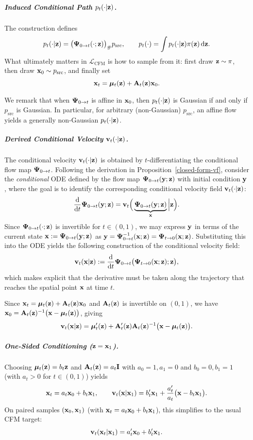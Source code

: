 \subparagraph{Induced Conditional Path $p_t(\cdot|{\mathbf{z}})$.}
The construction defines
\[
p_t(\cdot|{\mathbf{z}}) = \bigl({\bm{\Psi}}_{0\to t}( \cdot ;{\mathbf{z}})\bigr)_{\#} p_{\mathrm{src}},
\qquad
p_t(\cdot)  =  \int p_t(\cdot|{\mathbf{z}})\pi({\mathbf{z}})\mathop{}\!\mathrm{d}{\mathbf{z}}.
\]
What ultimately matters in $\mathcal{L}_{\mathrm{CFM}}$ is how to sample from it:  
first draw ${\mathbf{z}} \sim \pi$, then draw ${\mathbf{x}}_0 \sim p_{\mathrm{src}}$, and finally set
\[
{\mathbf{x}}_t = \bm\mu_t({\mathbf{z}}) + {\mathbf{A}}_t({\mathbf{z}}){\mathbf{x}}_0.
\]


We remark that when ${\bm{\Psi}}_{0\to t}$ is affine in ${\mathbf{x}}_0$, then $p_t( \cdot | {\mathbf{z}})$ is Gaussian 
if and only if $p_{\mathrm{src}}$ is Gaussian. 
In particular, for arbitrary (non-Gaussian) $p_{\mathrm{src}}$, an affine flow yields a
generally non-Gaussian $p_t(\cdot|{\mathbf{z}})$.


\subparagraph{Derived Conditional Velocity ${\mathbf{v}}_t(\cdot|{\mathbf{z}})$.} The conditional velocity ${\mathbf{v}}_t(\cdot|{\mathbf{z}})$ is obtained by $t$-differentiating the conditional flow map ${\bm{\Psi}}_{0\to t}$. Following the derivation in Proposition~\ref{closed-form-vf}, consider the \emph{conditional} ODE defined by the flow map ${\bm{\Psi}}_{0\to t}({\mathbf{y}};{\mathbf{z}})$ with initial condition ${\mathbf{y}}$, where the goal is to identify the corresponding conditional velocity field ${\mathbf{v}}_t(\cdot|{\mathbf{z}})$:
\[
\frac{\mathop{}\!\mathrm{d}}{\mathop{}\!\mathrm{d} t} {\bm{\Psi}}_{0\to t}({\mathbf{y}};{\mathbf{z}})
= {\mathbf{v}}_t \Big(\underbrace{{\bm{\Psi}}_{0\to t}({\mathbf{y}};{\mathbf{z}})}_{{\mathbf{x}}} \Big| {\mathbf{z}}\Big).
\]
Since ${\bm{\Psi}}_{0\to t}(\cdot;{\mathbf{z}})$ is invertible for $t\in(0,1)$, we may express ${\mathbf{y}}$ in terms of the current state ${\mathbf{x}}:={\bm{\Psi}}_{0\to t}({\mathbf{y}};{\mathbf{z}})$ as ${\mathbf{y}}={\bm{\Psi}}_{0\to t}^{-1}({\mathbf{x}};{\mathbf{z}})={\bm{\Psi}}_{t\to 0}({\mathbf{x}};{\mathbf{z}})$. Substituting this into the ODE yields the following construction of the conditional velocity field:
\[
{\mathbf{v}}_t({\mathbf{x}}|{\mathbf{z}})
:= \frac{\mathop{}\!\mathrm{d}}{\mathop{}\!\mathrm{d} t} {\bm{\Psi}}_{0\to t} \bigl({\bm{\Psi}}_{t\to 0}({\mathbf{x}};{\mathbf{z}});{\mathbf{z}}\bigr),
\]
which makes explicit that the derivative must be taken along the trajectory that reaches the spatial point ${\mathbf{x}}$ at time $t$.


Since ${\mathbf{x}}_t=\bm\mu_t({\mathbf{z}})+{\mathbf{A}}_t({\mathbf{z}}){\mathbf{x}}_0$ and ${\mathbf{A}}_t({\mathbf{z}})$ is invertible on $(0,1)$, we have ${\mathbf{x}}_0={\mathbf{A}}_t({\mathbf{z}})^{-1}\bigl({\mathbf{x}}-\bm\mu_t({\mathbf{z}})\bigr)$, giving
\[
{\mathbf{v}}_t({\mathbf{x}}|{\mathbf{z}})
 = 
\bm\mu_t'({\mathbf{z}}) + {\mathbf{A}}_t'({\mathbf{z}}) {\mathbf{A}}_t({\mathbf{z}})^{-1} \bigl({\mathbf{x}}-\bm\mu_t({\mathbf{z}})\bigr).
\]


\subparagraph{One-Sided Conditioning (${\mathbf{z}}={\mathbf{x}}_1$).}
Choosing $\bm\mu_t({\mathbf{z}})=b_t {\mathbf{z}}$ and ${\mathbf{A}}_t({\mathbf{z}})=a_t {\mathbf{I}}$ with $a_0=1,a_1=0$ and $b_0=0,b_1=1$ (with $a_t>0$ for $t\in(0,1)$) yields
\[
{\mathbf{x}}_t = a_t {\mathbf{x}}_0 + b_t {\mathbf{x}}_1,
\qquad
{\mathbf{v}}_t({\mathbf{x}}|{\mathbf{x}}_1) = b_t' {\mathbf{x}}_1 + \frac{a_t'}{a_t} \bigl({\mathbf{x}}-b_t{\mathbf{x}}_1\bigr).
\]
On paired samples $({\mathbf{x}}_0,{\mathbf{x}}_1)$ (with ${\mathbf{x}}_t=a_t{\mathbf{x}}_0+b_t{\mathbf{x}}_1$), this simplifies to the usual CFM target:
\[
{\mathbf{v}}_t({\mathbf{x}}_t|{\mathbf{x}}_1)=a_t' {\mathbf{x}}_0 + b_t' {\mathbf{x}}_1.
\]

